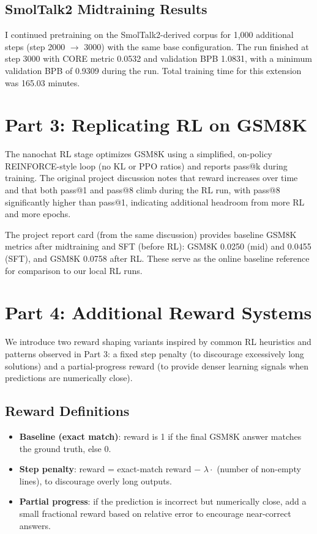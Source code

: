 \documentclass[11pt]{article}
\begin{document}
\subsection*{SmolTalk2 Midtraining Results}
I continued pretraining on the SmolTalk2-derived corpus for 1,000 additional steps (step 2000 $\rightarrow$ 3000) with the same base configuration. The run finished at step 3000 with CORE metric 0.0532 and validation BPB 1.0831, with a minimum validation BPB of 0.9309 during the run. Total training time for this extension was 165.03 minutes.

\section*{Part 3: Replicating RL on GSM8K}
The nanochat RL stage optimizes GSM8K using a simplified, on-policy REINFORCE-style loop (no KL or PPO ratios) and reports pass@k during training. The original project discussion notes that reward increases over time and that both pass@1 and pass@8 climb during the RL run, with pass@8 significantly higher than pass@1, indicating additional headroom from more RL and more epochs. \cite{karpathy_discussion}

The project report card (from the same discussion) provides baseline GSM8K metrics after midtraining and SFT (before RL): GSM8K 0.0250 (mid) and 0.0455 (SFT), and GSM8K 0.0758 after RL. \cite{karpathy_discussion} These serve as the online baseline reference for comparison to our local RL runs.

\section*{Part 4: Additional Reward Systems}
We introduce two reward shaping variants inspired by common RL heuristics and patterns observed in Part 3: a fixed step penalty (to discourage excessively long solutions) and a partial-progress reward (to provide denser learning signals when predictions are numerically close).

\subsection*{Reward Definitions}
\begin{itemize}
\item \textbf{Baseline (exact match)}: reward is 1 if the final GSM8K answer matches the ground truth, else 0.
\item \textbf{Step penalty}: reward = exact-match reward $-$ $\lambda \cdot$ (number of non-empty lines), to discourage overly long outputs.
\item \textbf{Partial progress}: if the prediction is incorrect but numerically close, add a small fractional reward based on relative error to encourage near-correct answers.
\end{itemize}
\end{document}
